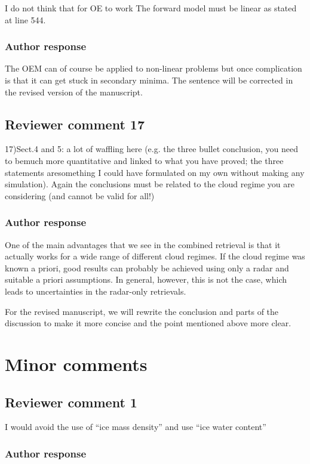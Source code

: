 \documentclass[11pt]{scrartcl}
\begin{document}
I do not think that for OE to work The forward model must be linear as stated at line 544.

\subsubsection*{Author response}

The OEM can of course be applied to non-linear problems but once complication is
that it can get stuck in secondary minima. The sentence will be corrected in
the revised version of the manuscript.

\subsection*{Reviewer comment 17}
17)Sect.4 and 5: a lot of waffling here (e.g. the three bullet conclusion, you
need to bemuch more quantitative and linked to what you have proved; the three
statements aresomething I could have formulated on my own without making any
simulation). Again the conclusions must be related to the cloud regime you are
considering (and cannot be valid for all!)

\subsubsection*{Author response}

One of the main advantages that we see in the combined retrieval is that it
actually works for a wide range of different cloud regimes. If the cloud regime
was known a priori, good results can probably be achieved using only a radar and
suitable a priori assumptions. In general, however, this is not the case, which
leads to uncertainties in the radar-only retrievals.

For the revised manuscript, we will rewrite the conclusion and parts of the discussion to make
it more concise and the point mentioned above more clear.

\section{Minor comments}

\subsection*{Reviewer comment 1}
I would avoid the use of “ice mass density” and use “ice water content”

\subsubsection*{Author response}
\end{document}
